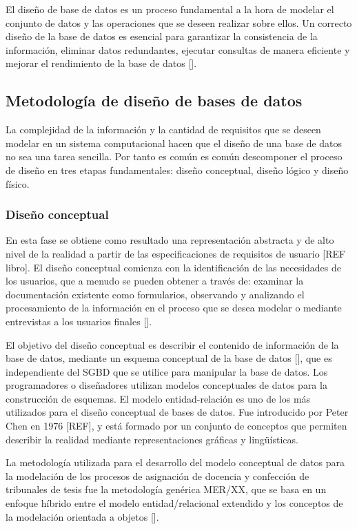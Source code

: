 El diseño de base de datos es un proceso fundamental a la hora 
de modelar el conjunto de datos y las operaciones que se deseen
realizar sobre ellos. Un correcto diseño de la base de datos
es esencial para garantizar la consistencia de la información,
eliminar datos redundantes, ejecutar consultas de manera 
eficiente y mejorar el rendimiento de la base de datos [\cite{db_book_cap2}]. 

\subsection{Metodología de diseño de bases de datos}
La complejidad de la información y la cantidad de requisitos que se 
deseen modelar en un sistema computacional hacen que el diseño de una 
base de datos no sea una tarea sencilla. Por tanto es común es común 
descomponer el proceso de diseño en tres etapas fundamentales: diseño conceptual,
diseño lógico y diseño físico. 


\subsubsection{Diseño conceptual}
En esta fase se obtiene como resultado una representación 
abstracta y de alto nivel de la realidad a partir de las 
especificaciones de requisitos de usuario [REF libro]. El diseño
conceptual comienza con la identificación de las necesidades de los 
usuarios, que a menudo se pueden obtener a través de: examinar
la documentación existente como formularios, observando y
analizando el procesamiento de la información en el proceso que 
se desea modelar o mediante entrevistas a los usuarios finales [\cite{db_requirement_analysis}].

El objetivo del diseño conceptual es describir el contenido de 
información de la base de datos, mediante un esquema conceptual de
la base de datos [\cite{db_book_cap3}], que es independiente del SGBD
que se utilice para manipular la base de datos.
Los programadores o diseñadores utilizan modelos conceptuales de datos 
para la construcción de esquemas. El modelo entidad-relación es uno 
de los más utilizados para el diseño conceptual de bases de datos. Fue 
introducido por Peter Chen en 1976 [REF], y está formado por 
un conjunto de conceptos que permiten describir la realidad mediante 
representaciones gráficas y lingüísticas.

La metodología utilizada 
para el desarrollo del modelo conceptual de datos para la modelación 
de los procesos de asignación de docencia y confección de tribunales de 
tesis fue la metodología genérica MER/XX, que se basa en un enfoque
híbrido entre el modelo entidad/relacional extendido y los conceptos de la 
modelación orientada a objetos [\cite{db_book_cap2}]. 

